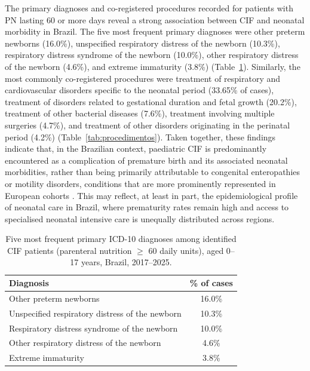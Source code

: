 \documentclass[pdflatex,sn-mathphys-num]{sn-jnl}
\theoremstyle{thmstyleone}%
\theoremstyle{thmstyletwo}%
\theoremstyle{thmstylethree}%
\begin{document}
The primary diagnoses and co-registered procedures recorded for patients with PN lasting 60 or more days reveal a strong association between CIF and neonatal morbidity in Brazil. The five most frequent primary diagnoses were other preterm newborns (16.0\%), unspecified respiratory distress of the newborn (10.3\%), respiratory distress syndrome of the newborn (10.0\%), other respiratory distress of the newborn (4.6\%), and extreme immaturity (3.8\%) (Table~\ref{tab:diagnosticos}). Similarly, the most commonly co-registered procedures were treatment of respiratory and cardiovascular disorders specific to the neonatal period (33.65\% of cases), treatment of disorders related to gestational duration and fetal growth (20.2\%), treatment of other bacterial diseases (7.6\%), treatment involving multiple surgeries (4.7\%), and treatment of other disorders originating in the perinatal period (4.2\%) (Table~\ref{tab:procedimentos}). Taken together, these findings indicate that, in the Brazilian context, paediatric CIF is predominantly encountered as a complication of premature birth and its associated neonatal morbidities, rather than being primarily attributable to congenital enteropathies or motility disorders, conditions that are more prominently represented in European cohorts \cite{beath2011trends, antunes2020portuguese}. This may reflect, at least in part, the epidemiological profile of neonatal care in Brazil, where prematurity rates remain high and access to specialised neonatal intensive care is unequally distributed across regions.

\begin{table}[ht]
\centering
\caption{Five most frequent primary ICD-10 diagnoses among identified CIF patients (parenteral nutrition $\geq$ 60 daily units), aged 0--17 years, Brazil, 2017--2025.}
\label{tab:diagnosticos}
\renewcommand{\arraystretch}{1.3}
\begin{tabular}{lc}
\hline
Diagnosis & \% of cases \\
\hline
Other preterm newborns & 16.0\% \\
Unspecified respiratory distress of the newborn & 10.3\% \\
Respiratory distress syndrome of the newborn & 10.0\% \\
Other respiratory distress of the newborn & 4.6\% \\
Extreme immaturity & 3.8\% \\
\hline
\end{tabular}
\end{table}
\end{document}
